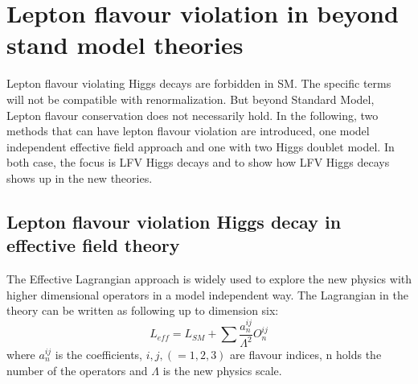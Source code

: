 \section{Lepton flavour violation in beyond stand model theories}
Lepton flavour violating Higgs decays are forbidden in SM. The specific terms will not be compatible with renormalization. But beyond Standard Model, Lepton flavour conservation does not necessarily hold. In the following, two methods that can have lepton flavour violation are introduced, one model independent effective field approach and one with two Higgs doublet model. In both case, the focus is LFV Higgs decays and to show how LFV Higgs decays shows up in the new theories. 


\subsection{Lepton flavour violation Higgs decay in effective field theory}
The Effective Lagrangian approach is widely used to explore the new physics with higher dimensional operators in a model independent way. The Lagrangian in the theory can be written as following up to dimension six: 
\begin{equation}
L_{eff}=L_{SM}+\sum\frac{a^{ij}_{n}}{\Lambda^{2}}O^{ij}_{n}
\end{equation}
where $a^{ij}_{n}$ is the coefficients, $i,j,(=1,2,3)$ are flavour indices, n holds the number of the operators and $\Lambda$ is the new physics scale. 

